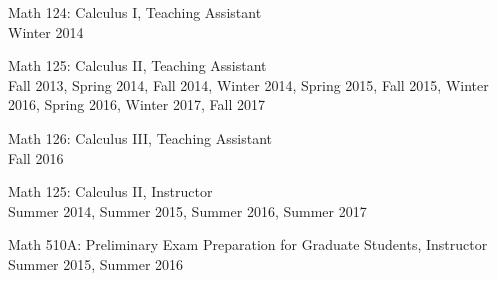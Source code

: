 \documentclass[12pt]{article}
\newenvironment{date_section}
	{
	\vspace{-1ex}
	\leftmargini = 15ex
		\begin{itemize}[
			labelsep = *,
			labelwidth = 9ex,
			labelindent = 0ex,
			itemindent = !,
			font=\normalfont,
			align=parleft
		]{}
		\itemsep=-1.5mm
	}
	{\end{itemize}\vspace{-2ex}}
\newcommand{\yearmo}[2]{
	\item[
		{\makebox[1ex][r]{#1}}
		\hspace{1ex}
		{\makebox[1ex][l]{#2} }
		] }
\newcommand{\yearrange}[2]{
	\item[
		{\makebox[1ex][r]{#1}}
		--
		{\makebox[1ex][l]{#2} }
		] }
\begin{document}
	\begin{date_section}
		
		\yearmo{}{} Math 124: Calculus I, Teaching Assistant
		\\
		Winter 2014
		
		\yearmo{}{} Math 125: Calculus II, Teaching Assistant
		\\
		Fall 2013, Spring 2014, Fall 2014, Winter 2014, Spring 2015, Fall 2015, Winter 2016, Spring 2016, Winter 2017, Fall 2017
		
		\yearmo{}{} Math 126: Calculus III, Teaching Assistant
		\\
		Fall 2016
		
		\yearmo{}{} Math 125: Calculus II, Instructor
		\\
		Summer 2014, Summer 2015, Summer 2016, Summer 2017
		
		\yearmo{}{} Math 510A: Preliminary Exam Preparation for Graduate Students, Instructor
		\\
		Summer 2015, Summer 2016
		
%		
%		
		
		
	\end{date_section}
\end{document}
